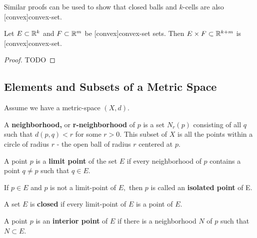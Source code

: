 \documentclass{article}
\begin{document}
\begin{note}
Similar proofs can be used to show that closed \@{balls} and $k$-cells are also \@[convex]{convex-set}.
\end{note}

\begin{theorem}\label{product-of-convex-sets-is-convex}
Let $E \subset \mathbb{R}^k$ and $F \subset \mathbb{R}^m$ be \@[convex]{convex-set} sets. Then $E \times F \subset \mathbb{R}^{k+m}$ is \@[convex]{convex-set}.
\end{theorem}

\begin{proof}
TODO
\end{proof}

\subsection{Elements and Subsets of a Metric Space}

\begin{note}\label{metric-space-context}
Assume we have a \@{metric-space} $(X, d).$
\end{note}

\begin{definition}[Neighborhood]
A \textbf{neighborhood,} or \textbf{r-neighborhood} of $p$ is a set $N_r(p)$ consisting of all $q$ such that $d(p, q) < r$ for some $r > 0.$ This subset of $X$ is all the points within a circle of radius $r$ - the open \@{ball} of radius $r$ centered at $p.$
\end{definition}

\begin{definition}
A point $p$ is a \textbf{limit point} of the set $E$ if every \@{neighborhood} of $p$ contains a point $q \neq p$ such that $q \in E.$
\end{definition}

\begin{definition}
If $p \in E$ and $p$ is not a \@{limit-point} of $E,$ then $p$ is called an \textbf{isolated point} of E.
\end{definition}

\begin{definition}[Closed]
A set $E$ is \textbf{closed} if every \@{limit-point} of $E$ is a point of $E.$
\end{definition}

\begin{definition}
A point $p$ is an \textbf{interior point} of $E$ if there is a \@{neighborhood} $N$ of $p$ such that $N \subset E.$
\end{definition}
\end{document}
